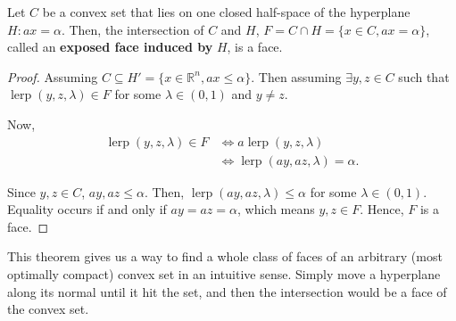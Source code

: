 \begin{theorem}
\label{thr:Exposed faces}
  Let \( C \) be a convex set that lies on one closed half-space of the
  hyperplane \( H: ax = \alpha \). Then, the intersection of \( C \) and \( H
  \), \( F = C \cap H = \{x \in C, ax = \alpha\}   \), called an \textbf{exposed
  face induced by} \( H \), is a face.
\end{theorem}

\begin{proof}
  Assuming \( C \subseteq H' = \{x \in \mathbb{R}^{n}, ax \le  \alpha\}   \).
  Then assuming \( \exists y, z \in C \) such that \( \operatorname{lerp}(y, z,
  \lambda) \in F \) for some \( \lambda \in (0, 1) \) and \( y \neq  z \).

  Now,
  \begin{align*}
    \operatorname{lerp}(y, z, \lambda) \in F &\iff a\operatorname{lerp}(y, z,
    \lambda)\\
                                             &\iff \operatorname{lerp}(ay, az,
                                             \lambda) = \alpha
  .\end{align*}
  
  Since \( y, z \in C \), \( ay, az \le \alpha \). Then, \(
  \operatorname{lerp}(ay, az, \lambda) \le \alpha \) for some \( \lambda \in (0,
  1) \). Equality occurs if and only if \( ay = az = \alpha \), which means \(
  y, z \in F \). Hence, \( F \) is a face.
\end{proof}

This theorem gives us a way to find a whole class of faces of an arbitrary
(most optimally compact) convex set in an intuitive sense. Simply move a
hyperplane along its normal until it hit the set, and then the intersection
would be a face of the convex set.
\newpage


